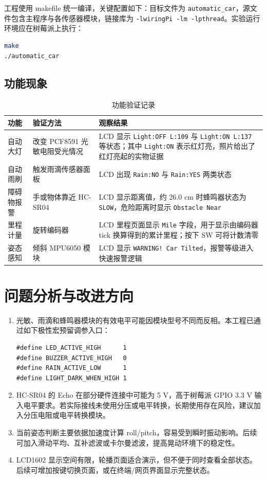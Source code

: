 \documentclass[UTF8,a4paper,12pt]{ctexart}
\begin{document}
工程使用 makefile 统一编译，关键配置如下：目标文件为 \texttt{automatic\_car}，源文件包含主程序与各传感器模块，链接库为 \texttt{-lwiringPi -lm -lpthread}。实验运行环境应在树莓派上执行：

\begin{lstlisting}[language=bash,caption={编译与运行命令}]
make
./automatic_car
\end{lstlisting}

\subsection{功能现象}

\begin{table}[H]
\centering
\caption{功能验证记录}
\begin{tabular}{p{3.2cm}p{5.1cm}p{6.2cm}}
\toprule
功能 & 验证方法 & 观察结果 \\
\midrule
自动大灯 & 改变 PCF8591 光敏电阻受光情况 & LCD 显示 \texttt{Light:OFF L:109} 与 \texttt{Light:ON L:137} 等状态；其中 \texttt{Light:ON} 表示红灯亮，照片给出了红灯亮起的实物证据 \\
自动雨刷 & 触发雨滴传感器面板 & LCD 出现 \texttt{Rain:NO} 与 \texttt{Rain:YES} 两类状态 \\
障碍物报警 & 手或物体靠近 HC-SR04 & LCD 显示距离值，约 26.0 cm 时蜂鸣器状态为 \texttt{SLOW}，危险距离时显示 \texttt{Obstacle Near} \\
里程计量 & 旋转编码器 & LCD 里程页面显示 \texttt{Mile} 字段，用于显示由编码器 tick 换算得到的累计里程；按下 SW 可将计数清零 \\
姿态感知 & 倾斜 MPU6050 模块 & LCD 显示 \texttt{WARNING! Car Tilted}，报警等级进入快速报警逻辑 \\
\bottomrule
\end{tabular}
\end{table}

\section{问题分析与改进方向}

\begin{enumerate}
  \item 光敏、雨滴和蜂鸣器模块的有效电平可能因模块型号不同而反相。本工程已通过如下极性宏预留调参入口：
\begin{lstlisting}
#define LED_ACTIVE_HIGH      1
#define BUZZER_ACTIVE_HIGH   0
#define RAIN_ACTIVE_LOW      1
#define LIGHT_DARK_WHEN_HIGH 1
\end{lstlisting}
  \item HC-SR04 的 Echo 在部分硬件连接中可能为 5 V，高于树莓派 GPIO 3.3 V 输入电平要求。若实际接线未使用分压或电平转换，长期使用存在风险，建议加入分压电阻或电平转换模块。
  \item 当前姿态判断主要依据加速度计算 roll/pitch，容易受到瞬时振动影响。后续可加入滑动平均、互补滤波或卡尔曼滤波，提高晃动环境下的稳定性。
  \item LCD1602 显示空间有限，轮播页面适合演示，但不便于同时查看全部状态。后续可增加按键切换页面，或在终端/网页界面显示完整状态。
\end{enumerate}
\end{document}
